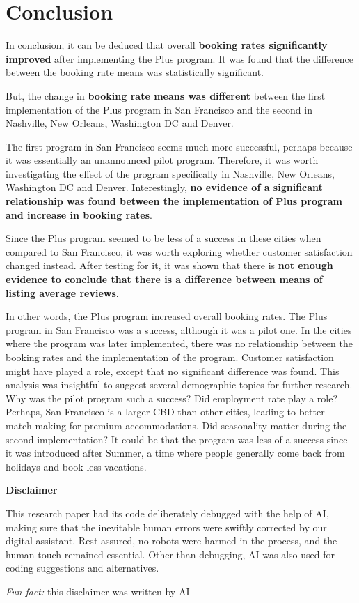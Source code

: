 \documentclass[
  12pt,
]{article}
\begin{document}
\section{Conclusion}\label{conclusion}

In conclusion, it can be deduced that overall \textbf{booking rates
significantly improved} after implementing the Plus program. It was
found that the difference between the booking rate means was
statistically significant.

But, the change in \textbf{booking rate means was different} between the
first implementation of the Plus program in San Francisco and the second
in Nashville, New Orleans, Washington DC and Denver.

The first program in San Francisco seems much more successful, perhaps
because it was essentially an unannounced pilot program. Therefore, it
was worth investigating the effect of the program specifically in
Nashville, New Orleans, Washington DC and Denver. Interestingly,
\textbf{no evidence of a significant relationship was found between the
implementation of Plus program and increase in booking rates}.

Since the Plus program seemed to be less of a success in these cities
when compared to San Francisco, it was worth exploring whether customer
satisfaction changed instead. After testing for it, it was shown that
there is \textbf{not enough evidence to conclude that there is a
difference between means of listing average reviews}.

In other words, the Plus program increased overall booking rates. The
Plus program in San Francisco was a success, although it was a pilot
one. In the cities where the program was later implemented, there was no
relationship between the booking rates and the implementation of the
program. Customer satisfaction might have played a role, except that no
significant difference was found. This analysis was insightful to
suggest several demographic topics for further research. Why was the
pilot program such a success? Did employment rate play a role? Perhaps,
San Francisco is a larger CBD than other cities, leading to better
match-making for premium accommodations. Did seasonality matter during
the second implementation? It could be that the program was less of a
success since it was introduced after Summer, a time where people
generally come back from holidays and book less vacations.

\vspace{60pt}

\textbf{Disclaimer}

This research paper had its code deliberately debugged with the help of
AI, making sure that the inevitable human errors were swiftly corrected
by our digital assistant. Rest assured, no robots were harmed in the
process, and the human touch remained essential. Other than debugging,
AI was also used for coding suggestions and alternatives.

\emph{Fun fact:} this disclaimer was written by AI
\end{document}
